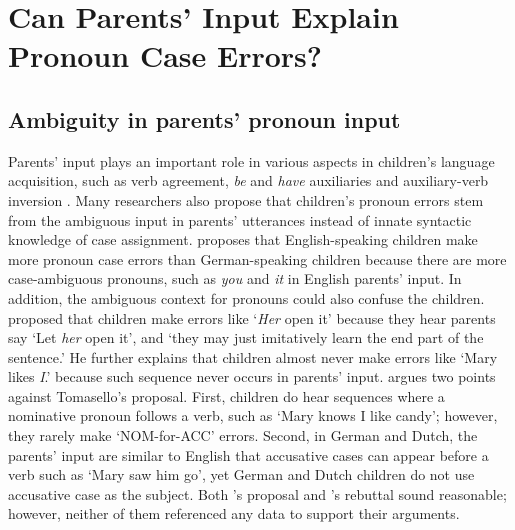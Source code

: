 \section{Can Parents' Input Explain Pronoun Case Errors?}

\subsection{Ambiguity in parents' pronoun input}
Parents' input plays an important role in various aspects in children's language acquisition, such as verb agreement, \textit{be} and \textit{have} auxiliaries and auxiliary-verb inversion \citep[e.g.][]{rowland2000subject,theakston2001role,theakston2002going,theakston2005acquisition}. Many researchers also propose that children's pronoun errors stem from the ambiguous input in parents' utterances instead of innate syntactic knowledge of case assignment. \cite{pelham2011input} proposes that English-speaking children make more pronoun case errors than German-speaking children because there are more case-ambiguous pronouns, such as \textit{you} and \textit{it} in English parents' input. In addition, the ambiguous context for pronouns could also confuse the children. \cite{tomasello2000,tomasello2003} proposed that children make errors like `\textit{Her} open it' because they hear parents say `Let \textit{her} open it', and `they may just imitatively learn the end part of the sentence.' He further explains that children almost never make errors like `Mary likes \textit{I}.' because such sequence never occurs in parents' input. \cite{wexler2003lenneberg} argues two points against Tomasello's proposal. First, children do hear sequences where a nominative pronoun follows a verb, such as `Mary knows I like candy'; however, they rarely make `NOM-for-ACC' errors. Second, in German and Dutch, the parents' input are similar to English that accusative cases can appear before a verb such as `Mary saw him go', yet German and Dutch children do not use accusative case as the subject. Both \cite{tomasello2000,tomasello2003}'s proposal and \cite{wexler2003lenneberg}'s rebuttal sound reasonable; however, neither of them referenced any data to support their arguments. 

